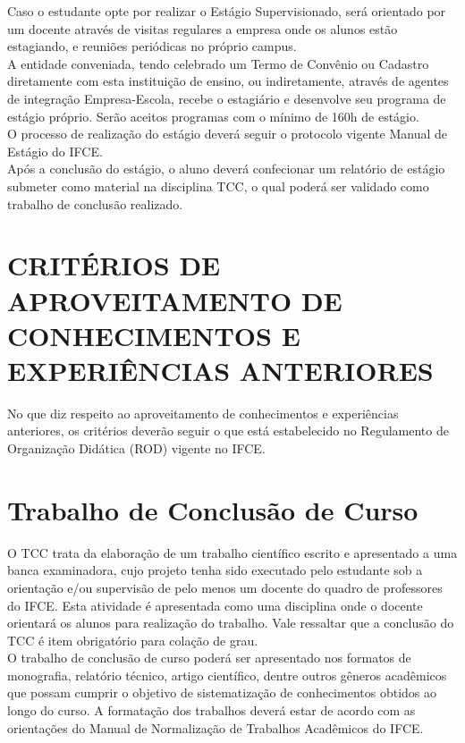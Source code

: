 Caso o estudante opte por realizar o Estágio Supervisionado, será orientado por um docente através de visitas regulares a empresa onde os alunos estão estagiando, e reuniões periódicas no próprio campus.\\

A entidade conveniada, tendo celebrado um Termo de Convênio ou Cadastro diretamente com esta instituição de ensino, ou indiretamente, através de agentes de integração Empresa-Escola, recebe o estagiário e desenvolve seu programa de estágio próprio. Serão aceitos programas com o mínimo de 160h de estágio.\\

O processo de realização do estágio deverá seguir o protocolo vigente Manual de Estágio do IFCE.\\

Após a conclusão do estágio, o aluno deverá confecionar um relatório de estágio submeter como material na disciplina TCC, o qual poderá ser validado como trabalho de conclusão realizado.\\

\chapter{CRITÉRIOS DE APROVEITAMENTO DE CONHECIMENTOS E EXPERIÊNCIAS ANTERIORES}

No que diz respeito ao aproveitamento de conhecimentos e experiências anteriores, os critérios deverão seguir o que está estabelecido no Regulamento de Organização Didática (ROD) vigente no IFCE.\\

\chapter{Trabalho de Conclusão de Curso}

O TCC trata da elaboração de um trabalho científico escrito e apresentado a uma banca examinadora, cujo projeto tenha sido executado pelo estudante sob a orientação e/ou supervisão de pelo menos um docente do quadro de professores do IFCE. Esta atividade é apresentada como uma disciplina onde o docente orientará os alunos para realização do trabalho. Vale ressaltar que a conclusão do TCC é item obrigatório para colação de grau.\\

O trabalho de conclusão de curso poderá ser apresentado nos formatos de monografia, relatório técnico, artigo científico, dentre outros gêneros acadêmicos que possam cumprir o objetivo de sistematização de conhecimentos obtidos ao longo do curso. A formatação dos trabalhos deverá estar de acordo com as orientações do Manual de Normalização de Trabalhos Acadêmicos do IFCE.\\

